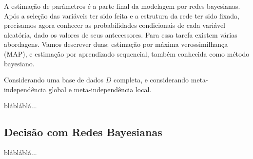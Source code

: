 A estimação de parâmetros é a parte final da modelagem por redes bayesianas. Após a seleção das variáveis ter sido feita e a estrutura da rede ter sido fixada, precisamos agora conhecer as probabilidades condicionais de cada variável aleatória, dado os valores de seus antecessores. Para essa tarefa existem várias abordagens. Vamos descrever duas: estimação por máxima verossimilhança (MAP), e estimação por aprendizado sequencial, também conhecida como método bayesiano.

Considerando uma base de dados $D$ completa, e considerando meta-independência global e meta-independência local.

blábláblá...

\subsection{Decisão com Redes Bayesianas}

blábláblá...
